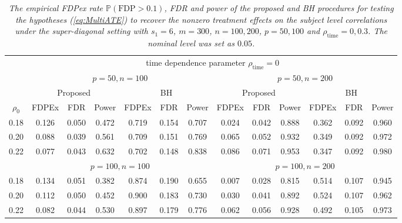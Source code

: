 \documentclass[12pt]{article}
\theoremstyle{definition}
\begin{document}
\iffalse
\begin{table}[!htb]
\scriptsize
\begin{center}
\caption{\textit{The empirical FDPex rate $\mathbb{P}(\mbox{FDP} > 0.1)$, FDR and power of the proposed and BH procedures for testing the hypotheses (\ref{eq:MultiATE}) to recover the nonzero treatment effects on the subject level correlations under the super-diagonal  setting with $s_1 = 6$, $m = 300$, $n = 100, 200$, $p = 50, 100$ and $\rho_{\mathrm{\scriptstyle time}} = 0, 0.3$. The nominal level was set as $0.05$.}} \medskip
\label{simulation3}
\begin{tabular}{c|ccc|ccc|ccc|ccc}
\hline\hline
 & \multicolumn{12}{c}{time dependence parameter $\rho_{\mathrm{\scriptstyle time}} = 0$} 
\\ \cline{2-13} 
 & \multicolumn{6}{c|}{$p = 50, n = 100$} & \multicolumn{6}{c}{$p = 50, n = 200$}
\\ \cline{2-13} 
 & \multicolumn{3}{c|}{Proposed} & \multicolumn{3}{c|}{BH} & \multicolumn{3}{c|}{Proposed} & \multicolumn{3}{c}{BH} 
\\ \cline{2-13} 
$\rho_0$ & FDPEx & FDR & Power & FDPEx & FDR & Power & FDPEx & FDR & Power & FDPEx & FDR & Power 
\\ \hline
0.18 &0.126&0.050&0.472&0.719&0.154&0.707 &0.024&0.042&0.888&0.362&0.092&0.960
\\ \cline{2-13}
0.20 &0.088&0.039&0.561&0.709&0.151&0.769 &0.065&0.052&0.932&0.349&0.092&0.972
\\ \cline{2-13}
0.22 &0.077&0.043&0.632&0.702&0.148&0.838 &0.086&0.071&0.953&0.347&0.092&0.980
\\ \hline
 & \multicolumn{6}{c|}{$p = 100, n = 100$} & \multicolumn{6}{c}{$p = 100, n = 200$}
\\ \hline
0.18 &0.134&0.051&0.382&0.874&0.190&0.655 &0.007&0.028&0.815&0.514&0.107&0.945
\\ \cline{2-13}
0.20 &0.112&0.050&0.452&0.900&0.183&0.730 &0.030&0.041&0.892&0.524&0.107&0.962
\\ \cline{2-13}
0.22 &0.082&0.044&0.530&0.897&0.179&0.776 &0.062&0.056&0.928&0.492&0.105&0.973
\\ \hline\hline


\end{tabular}
\end{center}
\end{table}
\end{document}
